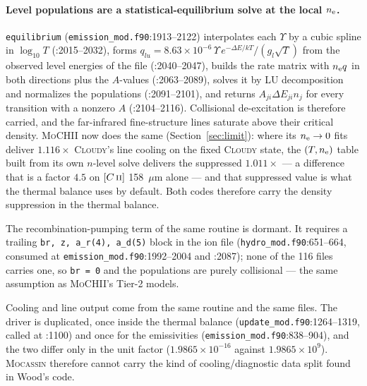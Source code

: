 \documentclass[english,a4paper]{my_memo}
\newcommand{\code}[1]{\texttt{#1}}
\newcommand{\MoCHII}{\textsc{MoCHII}}
\newcommand{\Cloudy}{\textsc{Cloudy}}
\newcommand{\Mocassin}{\textsc{Mocassin}}
\newcommand{\CII}{C\,\textsc{ii}}
\newcommand{\nel}{n_{\rm e}}
\begin{document}
\paragraph{Level populations are a statistical-equilibrium solve at the local
$\nel$.}  \code{equilibrium} (\code{emission\_mod.f90}:1913--2122) interpolates
each $\Upsilon$ by a cubic spline in $\log_{10}T$ (:2015--2032), forms
$q_{lu} = 8.63\times10^{-6}\,\Upsilon\,e^{-\Delta E/kT}/(g_l\sqrt{T})$ from the
observed level energies of the file (:2040--2047), builds the rate matrix with
$\nel q$ in both directions plus the $A$-values (:2063--2089), solves it by LU
decomposition and normalizes the populations (:2091--2101), and returns
$A_{ji}\Delta E_{ji}n_j$ for every transition with a nonzero $A$
(:2104--2116).  Collisional de-excitation is therefore carried, and the
far-infrared fine-structure lines saturate above their critical density.
\MoCHII{} now does the same (Section~\ref{sec:limit}): where its $\nel \to 0$
fits deliver $1.116\times$ \Cloudy{}'s line cooling on the fixed \Cloudy{}
state, the $(T, \nel)$ table built from its own $n$-level solve delivers the
suppressed $1.011\times$ --- a difference that is a factor $4.5$ on $[\CII{}]$
158~$\mu$m alone --- and that suppressed value is what the thermal balance uses
by default.  Both codes therefore carry the density suppression in the thermal
balance.

The recombination-pumping term of the same routine is dormant.  It requires a
trailing \code{br, z, a\_r(4), a\_d(5)} block in the ion file
(\code{hydro\_mod.f90}:651--664, consumed at
\code{emission\_mod.f90}:1992--2004 and :2087); none of the 116 files carries
one, so \code{br = 0} and the populations are purely collisional --- the same
assumption as \MoCHII{}'s Tier-2 models.

Cooling and line output come from the same routine and the same files.  The
driver is duplicated, once inside the thermal balance
(\code{update\_mod.f90}:1264--1319, called at :1100) and once for the
emissivities (\code{emission\_mod.f90}:838--904), and the two differ only in
the unit factor ($1.9865\times10^{-16}$ against $1.9865\times10^{9}$).
\Mocassin{} therefore cannot carry the kind of cooling/diagnostic data split
found in Wood's code.
\end{document}
